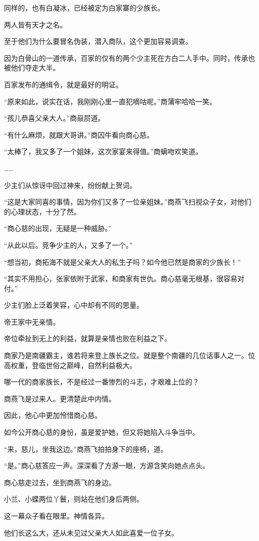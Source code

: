 \begin{this_body}
同样的，也有白凝冰，已经被定为白家寨的少族长。

两人皆有天才之名。

至于他们为什么要冒名伪装，潜入商队，这个更加容易调查。

因为白骨山的一道传承，百家的仅有的两个少主死在方白二人手中。同时，传承也被他们夺走大半。

百家发布的通缉令，就是最好的明证。

“原来如此，说实在话，我刚刚心里一直犯嘀咕呢。”商蒲牢哈哈一笑。

“孩儿恭喜父亲大人。”商赑屃道。

“有什么麻烦，就跟大哥讲。”商囚牛看向商心慈。

“太棒了，我又多了一个姐妹，这次家宴来得值。”商螭吻欢笑道。

……

少主们从惊讶中回过神来，纷纷献上贺词。

“这是大家同喜的事情，因为你们又多了一位亲姐妹。”商燕飞扫视众子女，对他们的心理状态，十分了然。

“商心慈的出现，无疑是一种威胁。”

“从此以后。竞争少主的人，又多了一个。”

“想当初，商拓海不就是父亲大人的私生子吗？如今他已然是商家的少族长！”

“其实不用担心，张家依附于武家，和商家有世仇。商心慈毫无根基，很容易对付。”

少主们脸上泛着笑容，心中却有不同的思量。

帝王家中无亲情。

帝位牵扯到无上的利益，就算是亲情也败在利益之下。

商家乃是南疆霸主，谁若将来登上族长之位。就是整个南疆的几位话事人之一。位高权重，登临世俗之巅峰，自然利益极大。

哪一代的商家族长，不是经过一番惨烈的斗志，才艰难上位的？

商燕飞是过来人。更清楚此中内情。

因此，他心中更加怜惜商心慈。

如今公开商心慈的身份，虽是爱护她，但又将她陷入斗争当中。

“来，慈儿，坐我这边。”商燕飞拍拍身下的座椅，道。

“是。”商心慈答应一声。深深看了方源一眼，方源含笑向她点点头。

商心慈走过去，坐到商燕飞的身边。

小兰、小蝶两位丫鬟，则站在他们身后两侧。

这一幕众子看在眼里。神情各异。

他们长这么大，还从未见过父亲大人如此喜爱一位子女。


\end{this_body}
